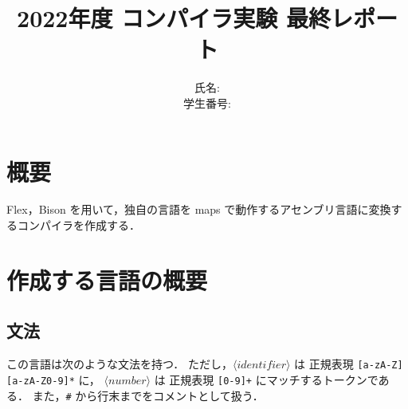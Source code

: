 \documentclass[lualatex, a4paper, ja=standard]{bxjsarticle}
\title{2022年度 コンパイラ実験 最終レポート}
\author{氏名:  \\ 学生番号: }
\begin{document}
\maketitle

\section{概要}
Flex，Bison を用いて，独自の言語を
maps で動作するアセンブリ言語に変換するコンパイラを作成する．

\section{作成する言語の概要}

\subsection{文法}

この言語は次のような文法を持つ．
ただし，$\langle\mathit{identifier}\rangle$ は
正規表現 \verb/[a-zA-Z][a-zA-Z0-9]*/ に，
$\langle\mathit{number}\rangle$ は
正規表現 \verb/[0-9]+/ にマッチするトークンである．
また，\verb'#' から行末までをコメントとして扱う．
\end{document}
